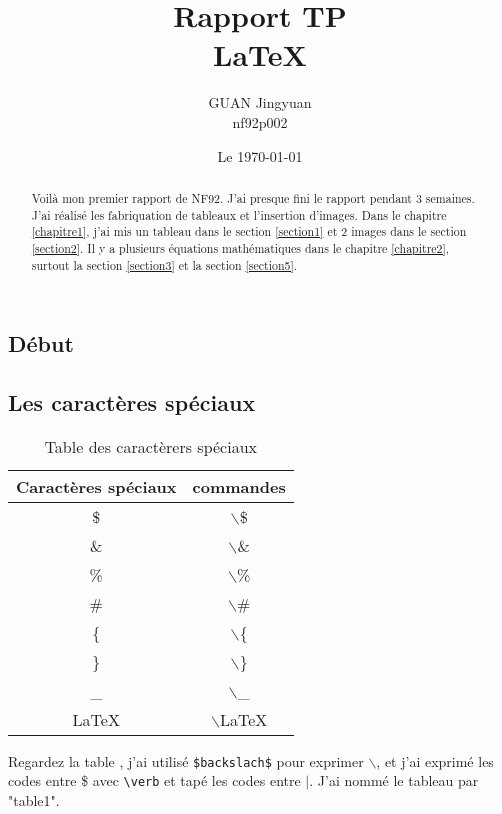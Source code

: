 \documentclass[a4paper,french,10pt]{report}
\begin{document}
	\title{Rapport TP \\ \LaTeX}
	\author{GUAN Jingyuan \\ nf92p002}
	\date{Le \today}
	\maketitle
	\tableofcontents
	\listoffigures
	\listoftables
	
\begin{abstract}
    \qquad Voilà mon premier rapport de NF92. J'ai presque fini le rapport pendant 3 semaines. J'ai réalisé les fabriquation de tableaux et l'insertion d'images. Dans le chapitre \ref{chapitre1}, j'ai mis un tableau dans le section \ref{section1} et 2 images dans le section \ref{section2}. Il y a plusieurs équations mathématiques dans le chapitre \ref{chapitre2}, surtout la section \ref{section3} et la section \ref{section5}.
    
\end{abstract}
	
	\begin{center}
		\chapter{Début}
		\label{chapitre1}
	\end{center}
	\section{Les caractères spéciaux}
	\label{section1}
	\begin{table} [h]\begin{center}
		\begin{tabular}{|c|c|}
  			\hline
  			Caractères spéciaux & commandes \\
  			\hline
			\hline
  			\$ & $\backslash$\$ \\
  			\hline
			\& & $\backslash$\& \\
			\hline
			\% & $\backslash$\% \\
			\hline
			\# & $\backslash$\# \\
			\hline
			\{ & $\backslash$\{ \\
			\hline
			\} & $\backslash$\} \\
			\hline
			\_ & $\backslash$\_ \\
			\hline
			\LaTeX & $\backslash$LaTeX \\
			\hline
		\end{tabular}
	\caption{Table des caractèrers spéciaux}	
	\label{table1}	
	\end{center} \end{table} 
	Regardez la table \label{table1}, j'ai utilisé \verb|$backslach$| pour exprimer $\backslash$, et j'ai exprimé les codes entre \$ avec \verb|\verb| et tapé les codes entre $|$. J'ai nommé le tableau par "table1".
	
\end{document}
